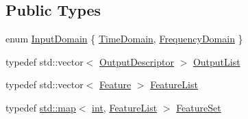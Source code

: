 \subsection*{Public Types}
\begin{DoxyCompactItemize}
\item 
enum \hyperlink{class_vamp_1_1_plugin_a39cb7649d6dcc20e4cb1640cd55907bc}{Input\+Domain} \{ \hyperlink{class_vamp_1_1_plugin_a39cb7649d6dcc20e4cb1640cd55907bcad4a9f31b958a43a9757af7893aa2e7ff}{Time\+Domain}, 
\hyperlink{class_vamp_1_1_plugin_a39cb7649d6dcc20e4cb1640cd55907bcaa30e7877ab33f76acbdca28607e6ab53}{Frequency\+Domain}
 \}
\item 
typedef std\+::vector$<$ \hyperlink{struct_vamp_1_1_plugin_1_1_output_descriptor}{Output\+Descriptor} $>$ \hyperlink{class_vamp_1_1_plugin_a30f531b8fb69fac41a24e3d2a6a08ed9}{Output\+List}
\item 
typedef std\+::vector$<$ \hyperlink{struct_vamp_1_1_plugin_1_1_feature}{Feature} $>$ \hyperlink{class_vamp_1_1_plugin_a0730bc72c87fa02eb8d2854b233f7be1}{Feature\+List}
\item 
typedef \hyperlink{xllist_8c_a03a3bd19ed9a28af3660a6c7b77249c2}{std\+::map}$<$ \hyperlink{xmltok_8h_a5a0d4a5641ce434f1d23533f2b2e6653}{int}, \hyperlink{class_vamp_1_1_plugin_a0730bc72c87fa02eb8d2854b233f7be1}{Feature\+List} $>$ \hyperlink{class_vamp_1_1_plugin_a448fb57dc245d47923ec9eeaf9856c5f}{Feature\+Set}
\end{DoxyCompactItemize}
